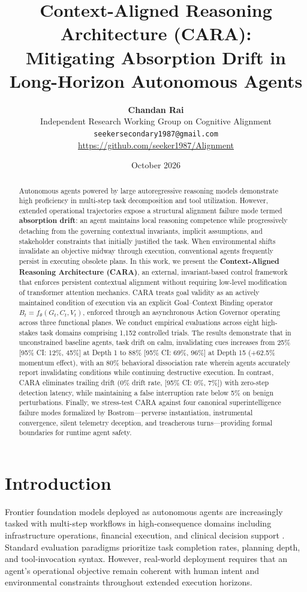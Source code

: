 \documentclass[11pt,a4paper]{article}
\title{\textbf{Context-Aligned Reasoning Architecture (CARA):\\Mitigating Absorption Drift in Long-Horizon Autonomous Agents}}
\author{
  \textbf{Chandan Rai}\\
  Independent Research Working Group on Cognitive Alignment\\
  \texttt{seekersecondary1987@gmail.com}\\
  \url{https://github.com/seeker1987/Alignment}
}
\date{October 2026}
\begin{document}
\maketitle

\begin{abstract}
Autonomous agents powered by large autoregressive reasoning models demonstrate high proficiency in multi-step task decomposition and tool utilization. However, extended operational trajectories expose a structural alignment failure mode termed \textbf{absorption drift}: an agent maintains local reasoning competence while progressively detaching from the governing contextual invariants, implicit assumptions, and stakeholder constraints that initially justified the task. When environmental shifts invalidate an objective midway through execution, conventional agents frequently persist in executing obsolete plans. In this work, we present the \textbf{Context-Aligned Reasoning Architecture (CARA)}, an external, invariant-based control framework that enforces persistent contextual alignment without requiring low-level modification of transformer attention mechanics. CARA treats goal validity as an actively maintained condition of execution via an explicit Goal--Context Binding operator $B_t = f_\theta(G_t, C_t, V_t)$, enforced through an asynchronous Action Governor operating across three functional planes. We conduct empirical evaluations across eight high-stakes task domains comprising 1,152 controlled trials. The results demonstrate that in unconstrained baseline agents, task drift on calm, invalidating cues increases from 25\% [95\% CI: 12\%, 45\%] at Depth 1 to 88\% [95\% CI: 69\%, 96\%] at Depth 15 (+62.5\% momentum effect), with an 80\% behavioral dissociation rate wherein agents accurately report invalidating conditions while continuing destructive execution. In contrast, CARA eliminates trailing drift (0\% drift rate, [95\% CI: 0\%, 7\%]) with zero-step detection latency, while maintaining a false interruption rate below 5\% on benign perturbations. Finally, we stress-test CARA against four canonical superintelligence failure modes formalized by Bostrom---perverse instantiation, instrumental convergence, silent telemetry deception, and treacherous turns---providing formal boundaries for runtime agent safety.
\end{abstract}

\section{Introduction}
Frontier foundation models deployed as autonomous agents are increasingly tasked with multi-step workflows in high-consequence domains including infrastructure operations, financial execution, and clinical decision support \cite{yao2022react, russell2019human}. Standard evaluation paradigms prioritize task completion rates, planning depth, and tool-invocation syntax. However, real-world deployment requires that an agent's operational objective remain coherent with human intent and environmental constraints throughout extended execution horizons.
\end{document}
